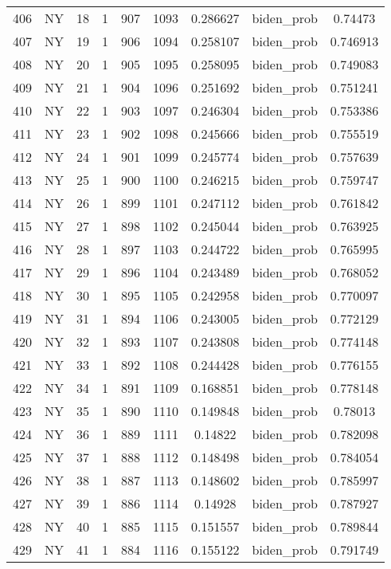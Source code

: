 \documentclass[12pt,a4paper]{article}
\begin{document}
\begin{tabular}{r|cccccccc}
	406 & NY & 18 & 1 & 907 & 1093 & 0.286627 & biden\_prob & 0.74473 \\
	407 & NY & 19 & 1 & 906 & 1094 & 0.258107 & biden\_prob & 0.746913 \\
	408 & NY & 20 & 1 & 905 & 1095 & 0.258095 & biden\_prob & 0.749083 \\
	409 & NY & 21 & 1 & 904 & 1096 & 0.251692 & biden\_prob & 0.751241 \\
	410 & NY & 22 & 1 & 903 & 1097 & 0.246304 & biden\_prob & 0.753386 \\
	411 & NY & 23 & 1 & 902 & 1098 & 0.245666 & biden\_prob & 0.755519 \\
	412 & NY & 24 & 1 & 901 & 1099 & 0.245774 & biden\_prob & 0.757639 \\
	413 & NY & 25 & 1 & 900 & 1100 & 0.246215 & biden\_prob & 0.759747 \\
	414 & NY & 26 & 1 & 899 & 1101 & 0.247112 & biden\_prob & 0.761842 \\
	415 & NY & 27 & 1 & 898 & 1102 & 0.245044 & biden\_prob & 0.763925 \\
	416 & NY & 28 & 1 & 897 & 1103 & 0.244722 & biden\_prob & 0.765995 \\
	417 & NY & 29 & 1 & 896 & 1104 & 0.243489 & biden\_prob & 0.768052 \\
	418 & NY & 30 & 1 & 895 & 1105 & 0.242958 & biden\_prob & 0.770097 \\
	419 & NY & 31 & 1 & 894 & 1106 & 0.243005 & biden\_prob & 0.772129 \\
	420 & NY & 32 & 1 & 893 & 1107 & 0.243808 & biden\_prob & 0.774148 \\
	421 & NY & 33 & 1 & 892 & 1108 & 0.244428 & biden\_prob & 0.776155 \\
	422 & NY & 34 & 1 & 891 & 1109 & 0.168851 & biden\_prob & 0.778148 \\
	423 & NY & 35 & 1 & 890 & 1110 & 0.149848 & biden\_prob & 0.78013 \\
	424 & NY & 36 & 1 & 889 & 1111 & 0.14822 & biden\_prob & 0.782098 \\
	425 & NY & 37 & 1 & 888 & 1112 & 0.148498 & biden\_prob & 0.784054 \\
	426 & NY & 38 & 1 & 887 & 1113 & 0.148602 & biden\_prob & 0.785997 \\
	427 & NY & 39 & 1 & 886 & 1114 & 0.14928 & biden\_prob & 0.787927 \\
	428 & NY & 40 & 1 & 885 & 1115 & 0.151557 & biden\_prob & 0.789844 \\
	429 & NY & 41 & 1 & 884 & 1116 & 0.155122 & biden\_prob & 0.791749 \\

\end{tabular}
\end{document}

